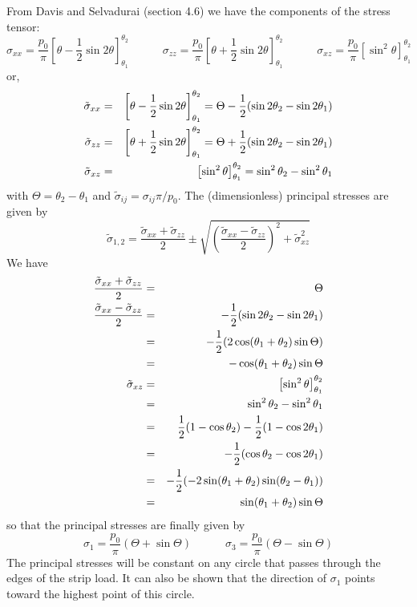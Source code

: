 From Davis and Selvadurai \cite{dase96}(section 4.6) we have the components of the stress tensor:
\[
\sigma_{xx}=\frac{p_0}{\pi}\left[ \theta - \frac{1}{2}\sin 2\theta  \right]^{\theta_2}_{\theta_1}
\quad\quad\quad
\sigma_{zz}=\frac{p_0}{\pi}\left[ \theta + \frac{1}{2}\sin 2\theta  \right]^{\theta_2}_{\theta_1}
\quad\quad\quad
\sigma_{xz}=\frac{p_0}{\pi}\left[ \sin^2 \theta  \right]^{\theta_2}_{\theta_1}
\]
or, 
\begin{eqnarray}
\tilde{\sigma}_{xx}&=&\left[ \theta - \frac{1}{2}\sin 2\theta  \right]^{\theta_2}_{\theta_1} = \Theta - \frac{1}{2} ( \sin 2\theta_2 - \sin 2\theta_1) \nonumber\\
\tilde{\sigma}_{zz}&=&\left[ \theta + \frac{1}{2}\sin 2\theta  \right]^{\theta_2}_{\theta_1} = \Theta + \frac{1}{2} ( \sin 2\theta_2 - \sin 2\theta_1) \nonumber\\
\tilde{\sigma}_{xz}&=&\left[ \sin^2 \theta  \right]^{\theta_2}_{\theta_1} =  \sin^2 \theta_2 - \sin^2 \theta_1 \nonumber
\end{eqnarray}
with $\Theta=\theta_2-\theta_1$ and $\tilde{\sigma}_{ij}=\sigma_{ij}\pi/p_0$.
The (dimensionless) principal stresses are given by 
\[
\tilde{\sigma}_{1,2}=\frac{\tilde{\sigma}_{xx}+\tilde{\sigma}_{zz}}{2} \pm \sqrt{  \left(\frac{\tilde{\sigma}_{xx}-\tilde{\sigma}_{zz}}{2}\right)^2 +\tilde{\sigma}_{xz}^2 }
\]
We have
\begin{eqnarray}
\frac{\tilde{\sigma}_{xx}+\tilde{\sigma}_{zz}}{2} &=&  \Theta 
\nonumber\\
\frac{\tilde{\sigma}_{xx}-\tilde{\sigma}_{zz}}{2}
&=&  -\frac{1}{2} (  \sin 2\theta_2 - \sin 2\theta_1 ) \nonumber\\
&=&  -\frac{1}{2} ( 2 \cos (\theta_1+\theta_2) \sin \Theta ) \nonumber\\ 
&=&  -\cos (\theta_1+\theta_2) \sin \Theta  \nonumber\\ 
\tilde{\sigma}_{xz}
&=&\left[ \sin^2 \theta  \right]^{\theta_2}_{\theta_1}  \nonumber\\
&=&\sin^2 \theta_2 - \sin^2 \theta_1 \nonumber\\
&=&\frac{1}{2} (1-\cos \theta_2) - \frac{1}{2} (1-\cos 2\theta_1) \nonumber\\
&=& -\frac{1}{2} (\cos \theta_2 - \cos 2\theta_1) \nonumber\\
&=& -\frac{1}{2} ( -2 \sin (\theta_1+\theta_2) \sin(\theta_2-\theta_1) ) \nonumber\\
&=& \sin (\theta_1+\theta_2) \sin \Theta \nonumber
\end{eqnarray}
so that the principal stresses are finally given by
\[
\sigma_1 = \frac{p_0}{\pi} ( \Theta + \sin \Theta) 
\quad\quad\quad
\sigma_3 = \frac{p_0}{\pi} ( \Theta - \sin \Theta) 
\]
The principal stresses will be constant on any circle that passes through the edges of the 
strip load. It can also be shown that the direction of $\sigma_1$ points toward the highest 
point of this circle.



